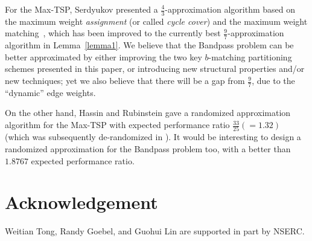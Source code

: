 \documentclass[11pt,twoside]{article}\usepackage{amssymb,latexsym,graphicx,hyperref}\usepackage{epstopdf}
\begin{document}
For the Max-TSP, Serdyukov presented a $\frac 43$-approximation algorithm based on
the maximum weight {\em assignment} (or called {\em cycle cover}) and the maximum weight matching~\cite{Ser84},
which has been improved to the currently best $\frac 97$-approximation algorithm in Lemma~\ref{lemma1}.
We believe that the Bandpass problem can be better approximated by
either improving the two key $b$-matching partitioning schemes presented in this paper,
or introducing new structural properties and/or new techniques;
yet we also believe that there will be a gap from $\frac 97$, due to the ``dynamic'' edge weights.


On the other hand, Hassin and Rubinstein gave a randomized approximation algorithm for the Max-TSP
with expected performance ratio $\frac {33}{25} ( = 1.32)$~\cite{HR00} (which was subsequently de-randomized in \cite{COW05}).
It would be interesting to design a randomized approximation for the Bandpass problem too, with a better than $1.8767$ expected performance ratio.


\section*{Acknowledgement}
Weitian Tong, Randy Goebel, and Guohui Lin are supported in part by NSERC.
\end{document}
